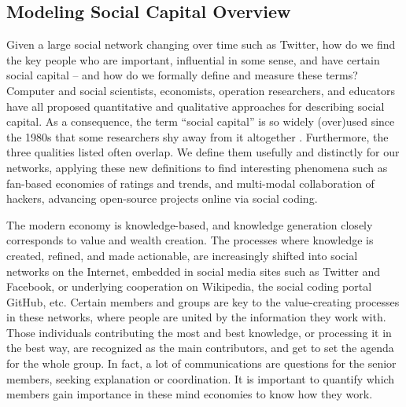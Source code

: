\documentclass[10pt,oneside]{memoir}
\begin{document}
\pagebreak \subsection{Modeling Social Capital Overview}
\label{modelingsocialcapitaloverview}

Given a large social network changing over time such as Twitter, how do we find the key people who are important, influential in some sense, and have certain social capital -- and how do we formally define and measure these terms? Computer and social scientists, economists, operation researchers, and educators have all proposed quantitative and qualitative approaches for describing social capital. As a consequence, the term ``social capital'' is so widely (over)used since the 1980s that some researchers shy away from it altogether \cite{jackson2008social}. Furthermore, the three qualities listed often overlap. We define them usefully and distinctly for our networks, applying these new definitions to find interesting phenomena such as fan-based economies of ratings and trends, and multi-modal collaboration of hackers, advancing open-source projects online via social coding.


The modern economy is knowledge-based, and knowledge generation closely corresponds to value and wealth creation. The processes where knowledge is created, refined, and made actionable, are increasingly shifted into social networks on the Internet, embedded in social media sites such as Twitter and Facebook, or underlying cooperation on Wikipedia, the social coding portal GitHub, etc. Certain members and groups are key to the value-creating processes in these networks, where people are united by the information they work with. Those individuals contributing the most and best knowledge, or processing it in the best way, are recognized as the main contributors, and get to set the agenda for the whole group. In fact, a lot of communications are questions for the senior members, seeking explanation or coordination. It is important to quantify which members gain importance in these mind economies to know how they work.
\end{document}
